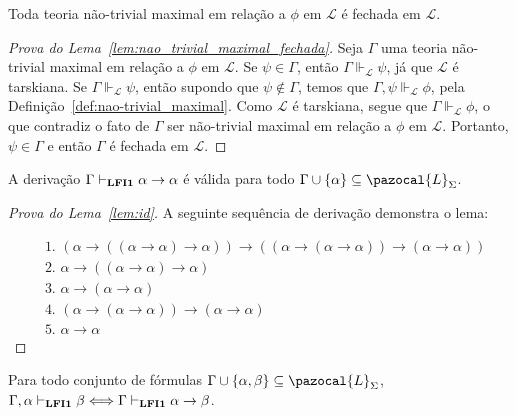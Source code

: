     \begin{lema}
        \label{lem:nao_trivial_maximal_fechada}
        Toda teoria não-trivial maximal em relação a $\phi$ em $\mathcal{L}$ é fechada em $\mathcal{L}$.
    \end{lema}

    \begin{proof}[Prova do Lema~\ref{lem:nao_trivial_maximal_fechada}]
        Seja $\Gamma$ uma teoria não-trivial maximal em relação a $\phi$ em $\mathcal{L}$. Se $\psi \in \Gamma$, então $\Gamma \Vdash_{\mathcal{L}} \psi$, já que $\mathcal{L}$ é tarskiana. Se $\Gamma \Vdash_{\mathcal{L}} \psi$, então supondo que $\psi \notin \Gamma$, temos que $\Gamma, \psi \Vdash_{\mathcal{L}} \phi$, pela Definição~\ref{def:nao-trivial_maximal}. Como $\mathcal{L}$ é tarskiana, segue que $\Gamma \Vdash_{\mathcal{L}} \phi$, o que contradiz o fato de $\Gamma$ ser não-trivial maximal em relação a $\phi$ em $\mathcal{L}$. Portanto, $\psi \in \Gamma$ e então $\Gamma$ é fechada em $\mathcal{L}$.
    \end{proof}

    
    \begin{lema}
        \label{lem:id}
        A derivação $\Gamma \vdash_{\textbf{LFI1}{}} \alpha \to \alpha$ é válida para todo $\Gamma \cup \{\alpha\} \subseteq \pazocal{L}_{\Sigma}$.
    \end{lema}
    
    \begin{proof}[Prova do Lema~\ref{lem:id}]
        A seguinte sequência de derivação demonstra o lema:
        
        \begin{align*}
            & \text{1. } (\alpha \to ((\alpha \to \alpha) \to \alpha)) \to ((\alpha \to (\alpha \to \alpha)) \to (\alpha \to \alpha))\tag{Ax2}\\
            & \text{2. } \alpha \to ((\alpha \to \alpha) \to \alpha)\tag{Ax1}\\
            & \text{3. } \alpha \to (\alpha \to \alpha)\tag{Ax1}\\
            & \text{4. } (\alpha \to (\alpha \to \alpha)) \to (\alpha \to \alpha)\tag{MP 1,2}\\
            & \text{5. } \alpha \to \alpha\tag{MP 3,4}
        \end{align*}
    \end{proof}
    
    
    \begin{teorema}
        \label{teo:deducao}
        Para todo conjunto de fórmulas $\Gamma \cup \{\alpha, \beta \} \subseteq \pazocal{L}_{\Sigma}$, $\Gamma, \alpha \vdash_{\textbf{LFI1}{}} \beta \Longleftrightarrow \Gamma \vdash_{\textbf{LFI1}{}} \alpha \to \beta$.
    \end{teorema}


